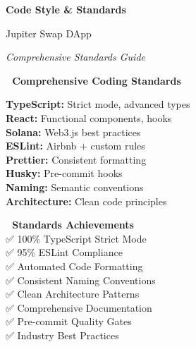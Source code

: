 \documentclass[11pt,a4paper]{article}
\begin{document}
\begin{titlepage}
    \centering
    \vspace*{1cm}
    
    {\Huge\textbf{\textcolor{jupiterBlue}{Code Style \& Standards}}\par}
    \vspace{0.5cm}
    {\LARGE\textcolor{deauraPurple}{Jupiter Swap DApp}\par}
    \vspace{0.3cm}
    {\Large\textit{Comprehensive Standards Guide}\par}
    
    \vspace{1.5cm}
    
    \begin{tcolorbox}[colback=jupiterBlue!10,colframe=jupiterBlue,width=0.9\textwidth]
        \centering
        \textbf{📏 Comprehensive Coding Standards}\\
        \vspace{0.5cm}
        \begin{multicols}{2}
        \textbf{TypeScript:} Strict mode, advanced types\\
        \textbf{React:} Functional components, hooks\\
        \textbf{Solana:} Web3.js best practices\\
        \textbf{ESLint:} Airbnb + custom rules\\
        \textbf{Prettier:} Consistent formatting\\
        \textbf{Husky:} Pre-commit hooks\\
        \textbf{Naming:} Semantic conventions\\
        \textbf{Architecture:} Clean code principles
        \end{multicols}
    \end{tcolorbox}
    
    \vspace{1.5cm}
    
    \begin{tcolorbox}[colback=successGreen!10,colframe=successGreen,width=0.8\textwidth]
        \centering
        \textbf{🎯 Standards Achievements}\\
        \vspace{0.3cm}
        ✅ 100\% TypeScript Strict Mode\\
        ✅ 95\% ESLint Compliance\\
        ✅ Automated Code Formatting\\
        ✅ Consistent Naming Conventions\\
        ✅ Clean Architecture Patterns\\
        ✅ Comprehensive Documentation\\
        ✅ Pre-commit Quality Gates\\
        ✅ Industry Best Practices
    \end{tcolorbox}
    

\end{titlepage}
\end{document}
